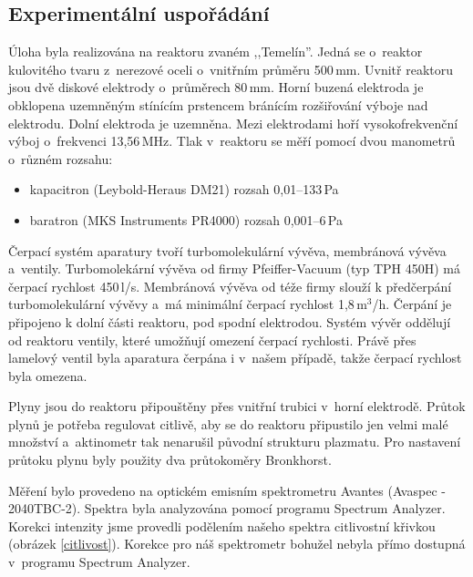 \documentclass[12pt]{article}
\begin{document}
\subsection{Experimentální uspořádání}
Úloha byla realizována na reaktoru zvaném ,,Temelín''. Jedná se o~reaktor kulovitého tvaru z~nerezové oceli o~vnitřním průměru 500\,mm. Uvnitř reaktoru jsou dvě diskové elektrody o~průměrech 80\,mm. Horní buzená elektroda je obklopena uzemněným stínícím prstencem bránícím rozšiřování výboje nad elektrodu.  Dolní elektroda je uzemněna. Mezi elektrodami hoří vysokofrekvenční výboj o~frekvenci 13,56\,MHz. Tlak v~reaktoru se měří pomocí dvou manometrů o~různém rozsahu:

\begin{itemize}
\item kapacitron		(Leybold-Heraus DM21) 		rozsah 0,01--133\,Pa
\item baratron 		(MKS Instruments PR4000)		rozsah 0,001--6\,Pa
\end{itemize}

Čerpací systém aparatury tvoří turbomolekulární vývěva, membránová vývěva a~ventily. Turbomolekární vývěva od firmy Pfeiffer-Vacuum (typ TPH 450H) má čerpací rychlost 450\,l/s. Membránová vývěva od téže firmy slouží k předčerpání turbomolekulární vývěvy a~má minimální čerpací rychlost 1,8\,m$^3$/h. Čerpání je připojeno k dolní části reaktoru, pod spodní elektrodou. Systém vývěr oddělují od reaktoru ventily, které umožňují omezení čerpací rychlosti. Právě přes lamelový ventil byla aparatura čerpána i v~našem případě, takže čerpací rychlost byla omezena. 

Plyny jsou do reaktoru připouštěny přes vnitřní trubici v~horní elektrodě. Průtok plynů je potřeba regulovat citlivě, aby se do reaktoru připustilo jen velmi malé množství a~aktinometr tak nenarušil původní strukturu plazmatu. Pro nastavení průtoku plynu byly použity dva průtokoměry Bronkhorst.

Měření bylo provedeno na optickém emisním spektrometru Avantes (Avaspec - 2040TBC-2). Spektra byla analyzována pomocí programu Spectrum Analyzer. Korekci intenzity jsme provedli podělením našeho spektra citlivostní křivkou (obrázek \ref{citlivost}). Korekce pro náš spektrometr bohužel nebyla přímo dostupná v~programu Spectrum Analyzer.
\end{document}
